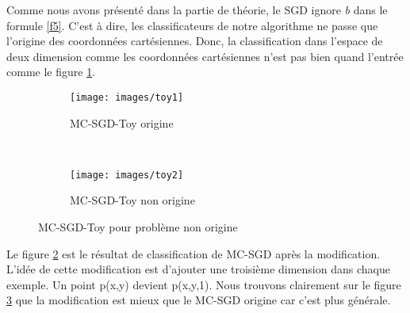 Comme nous avons présenté dans la partie de théorie, le SGD ignore \textit{b} dans le formule \ref{f5}. C'est à dire, les classificateurs de notre algorithme ne passe que l'origine des coordonnées cartésiennes. Donc, la classification dans l'espace de deux dimension comme les coordonnées cartésiennes n'est pas bien quand l'entrée comme le figure \ref{fig:toy1}.
\begin{figure}[htbp!]
        \centering
        \begin{subfigure}[b]{0.4\textwidth}
                \texttt{[image: images/toy1]}
				\caption{MC-SGD-Toy origine}
				\label{fig:toy1}
        \end{subfigure}%
        ~ %
        \begin{subfigure}[b]{0.425\textwidth}
                \texttt{[image: images/toy2]}
				\caption{MC-SGD-Toy non origine}
				\label{fig:toy2}
        \end{subfigure}
        \caption{MC-SGD-Toy pour problème non origine}\label{fig:toyorg}
\end{figure}

Le figure \ref{fig:toy2} est le résultat de classification de MC-SGD après la modification. L'idée de cette modification est d'ajouter une troisième dimension dans chaque exemple. Un point p(x,y) devient p(x,y,1). Nous trouvons clairement sur le figure \ref{fig:toyorg} que la modification est mieux que le MC-SGD origine car c'est plus générale.